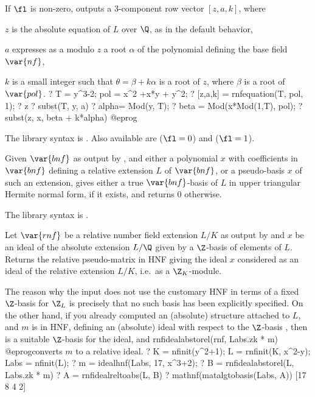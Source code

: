 If $\fl$ is non-zero, outputs a 3-component row vector $[z,a,k]$, where

\item $z$ is the absolute equation of $L$ over $\Q$, as in the default
behavior,

\item $a$ expresses as a  modulo $z$ a root $\alpha$ of the
polynomial defining the base field $\var{nf}$,

\item $k$ is a small integer such that $\theta = \beta+k\alpha$
is a root of $z$, where $\beta$ is a root of $\var{pol}$.
\bprog
? T = y^3-2; pol = x^2 +x*y + y^2;
? [z,a,k] = rnfequation(T, pol, 1);
? z
? subst(T, y, a)
? alpha= Mod(y, T);
? beta = Mod(x*Mod(1,T), pol);
? subst(z, x, beta + k*alpha)
@eprog

The library syntax is .
Also available are
 ($\fl = 0$) and
 ($\fl = 1$).

\label{se:rnfhnfbasis}
Given $\var{bnf}$ as output by
, and either a polynomial $x$ with coefficients in $\var{bnf}$
defining a relative extension $L$ of $\var{bnf}$, or a pseudo-basis $x$ of
such an extension, gives either a true $\var{bnf}$-basis of $L$ in upper
triangular Hermite normal form, if it exists, and returns $0$ otherwise.

The library syntax is .

\label{se:rnfidealabstorel}
Let $\var{rnf}$ be a relative
number field extension $L/K$ as output by  and $x$ be an ideal of
the absolute extension $L/\Q$ given by a $\Z$-basis of elements of $L$.
Returns the relative pseudo-matrix in HNF giving the ideal $x$ considered as
an ideal of the relative extension $L/K$, i.e.~as a $\Z_K$-module.

The reason why the input does not use the customary HNF in terms of a fixed
$\Z$-basis for $\Z_L$ is precisely that no such basis has been explicitly
specified. On the other hand, if you already computed an (absolute) 
structure  attached to $L$, and $m$ is in HNF, defining
an (absolute) ideal with respect to the $\Z$-basis , then
 is a suitable $\Z$-basis for the ideal, and
\bprog
  rnfidealabstorel(rnf, Labs.zk * m)
@eprog\noindent converts $m$ to a relative ideal.
\bprog
? K = nfinit(y^2+1); L = rnfinit(K, x^2-y); Labs = nfinit(L);
? m = idealhnf(Labs, 17, x^3+2);
? B = rnfidealabstorel(L, Labs.zk * m)
? A = rnfidealreltoabs(L, B)
? mathnf(matalgtobasis(Labs, A))
[17 8 4 2]

